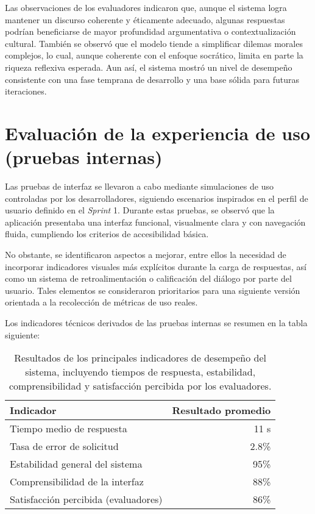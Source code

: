 Las observaciones de los evaluadores indicaron que, aunque el sistema logra
mantener un discurso coherente y éticamente adecuado, algunas respuestas
podrían beneficiarse de mayor profundidad argumentativa o contextualización
cultural. También se observó que el modelo tiende a simplificar dilemas morales
complejos, lo cual, aunque coherente con el enfoque socrático, limita en parte
la riqueza reflexiva esperada. Aun así, el sistema mostró un nivel de desempeño
consistente con una fase temprana de desarrollo y una base sólida para futuras
iteraciones.

\section{Evaluación de la experiencia de uso (pruebas internas)}
Las pruebas de interfaz se llevaron a cabo mediante simulaciones de uso
controladas por los desarrolladores, siguiendo escenarios inspirados en el
perfil de usuario definido en el \textit{Sprint} 1. Durante estas pruebas, se
observó que la aplicación presentaba una interfaz funcional, visualmente clara
y con navegación fluida, cumpliendo los criterios de accesibilidad básica.

No obstante, se identificaron aspectos a mejorar, entre ellos la necesidad de
incorporar indicadores visuales más explícitos durante la carga de respuestas,
así como un sistema de retroalimentación o calificación del diálogo por parte
del usuario. Tales elementos se consideraron prioritarios para una siguiente
versión orientada a la recolección de métricas de uso reales.

Los indicadores técnicos derivados de las pruebas internas se resumen en la
tabla siguiente:

\begin{table}[H]
      \centering
      \renewcommand{\arraystretch}{1.2}
      \begin{tabular}{|l|r|}
            \hline
            \textbf{Indicador}                   & \textbf{Resultado promedio} \\ \hline
            Tiempo medio de respuesta            & 11 s                        \\ \hline
            Tasa de error de solicitud           & 2.8\%                       \\ \hline
            Estabilidad general del sistema      & 95\%                        \\ \hline
            Comprensibilidad de la interfaz      & 88\%                        \\ \hline
            Satisfacción percibida (evaluadores) & 86\%                        \\ \hline
      \end{tabular}
      \caption[Indicadores de desempeño del sistema]{Resultados de los principales indicadores de desempeño del sistema, incluyendo tiempos de respuesta, estabilidad, comprensibilidad y satisfacción percibida por los evaluadores.}
      \label{tab:indicadores-desempeno}
\end{table}

